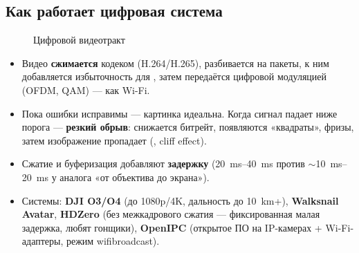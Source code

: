 \subsection{Как работает цифровая система}
\begin{figure}[H]\centering
{}
\caption{Цифровой видеотракт}
\end{figure}
\begin{itemize}
\item Видео \textbf{сжимается} кодеком (H.264/H.265), разбивается на пакеты, к ним добавляется избыточность для , затем передаётся цифровой модуляцией (OFDM, QAM) — как Wi-Fi.
\item Пока ошибки исправимы — картинка идеальна. Когда сигнал падает ниже порога — \textbf{резкий обрыв}: снижается битрейт, появляются «квадраты», фризы, затем изображение пропадает (, cliff effect).
\item Сжатие и буферизация добавляют \textbf{задержку} (\SIrange{20}{40}{\milli\second} против $\sim$\SIrange{10}{20}{\milli\second} у аналога «от объектива до экрана»).
\item Системы: \textbf{DJI O3/O4} (до 1080p/4K, дальность до \SI{10}{\kilo\metre}+), \textbf{Walksnail Avatar}, \textbf{HDZero} (без межкадрового сжатия — фиксированная малая задержка, любят гонщики), \textbf{OpenIPC} (открытое ПО на IP-камерах + Wi-Fi-адаптеры, режим wifibroadcast).
\end{itemize}

